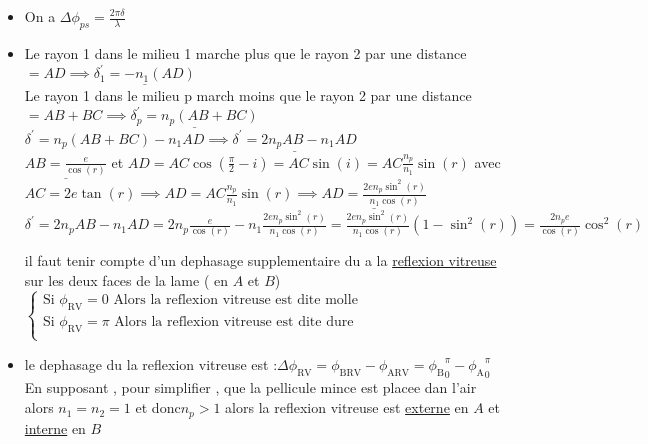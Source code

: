 \documentclass[12pt]{book}
\begin{document}
            \begin{itemize}
                \item  On a $\Delta\phi_{ps} = \frac{2\pi\delta}{\lambda}$
                \item Le rayon 1 dans le milieu 1 marche plus que le rayon 2 par une distance $ = AD \implies \underline{\delta_1^{'} = -n_1(AD)}$ \\
                    Le rayon 1 dans le milieu p march moins que le rayon 2 par une distance $= AB+BC\implies \underline{\delta_p^{'} = n_p(AB+BC)}$ \\
                    $\delta^{'} = n_p(AB+BC)-n_1AD \implies \underline{ \delta^{'}= 2n_pAB-n_1AD }$\\
                    $\underline{AB = \frac{e}{\cos(r)}}$ et $ AD=AC\cos(\frac{\pi}{2}-i)=AC\sin(i)=AC\frac{n_p}{n_1}\sin(r) $ avec $AC = 2e\tan(r) \implies AD =AC\frac{n_p}{n_1}\sin(r)\implies \underline{AD =\frac{2en_p\sin^2(r)}{n_1\cos(r)}}$ \\
                    $\delta^{'} =2n_pAB-n_1AD = 2n_p\frac{e}{\cos(r)} -n_1\frac{2en_p\sin^2(r)}{n_1\cos(r)} = \frac{2en_p\sin^2(r)}{n_1\cos(r)}(1-\sin^2(r))=\frac{2n_pe}{\cos(r)}\cos^2(r)$ \\
                    \begin{center}
                    \end{center}
                    \vspace*{15px}
                    il faut tenir compte d'un dephasage supplementaire du a la \underline{reflexion vitreuse} sur les deux faces de la lame ( en $A$ et $B $) 
                        $\begin{cases}
                            \text{Si } \phi_{\text{RV}} = 0 \text{ Alors la reflexion vitreuse est dite molle } \\
                            \text{Si } \phi_{\text{RV}} = \pi \text{ Alors la reflexion vitreuse est dite dure } \\
                        \end{cases}$ 
                \item le dephasage du la reflexion vitreuse est :$\Delta\phi_{\text{RV}} = \phi_{\text{BRV}} -\phi_{\text{ARV}} = {\phi_{\text{B}}}^\pi_0 - {\phi_{\text{A}}}^\pi_0$ \\
                    En supposant , pour simplifier , que la pellicule mince est placee dan l'air alors $n_1=n_2=1$ et donc$n_p > 1$ alors la reflexion vitreuse est \underline{externe} en $A$ et \underline{interne} en $B$\\

\end{itemize}
\end{document}
